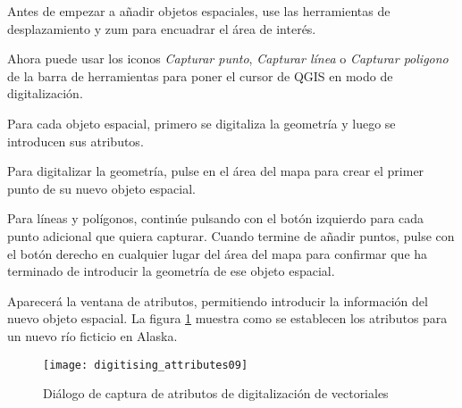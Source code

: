 
Antes de empezar a añadir objetos espaciales, use las herramientas de desplazamiento y zum para encuadrar el área de interés.

Ahora puede usar los iconos \textit{Capturar punto}, \textit{Capturar línea} o \textit{Capturar poligono} de la barra de herramientas para poner el cursor de QGIS en modo de digitalización.

Para cada objeto espacial, primero se digitaliza la geometría y luego se introducen sus atributos.

Para digitalizar la geometría, pulse en el área del mapa para crear el primer punto de su nuevo objeto espacial.

Para líneas y polígonos, continúe pulsando con el botón izquierdo para cada punto adicional que quiera capturar. Cuando termine de añadir puntos, pulse con el botón derecho en cualquier lugar del área del mapa para confirmar que ha terminado de introducir la geometría de ese objeto espacial.

Aparecerá la ventana de atributos, permitiendo introducir la información del nuevo objeto espacial. La figura \ref{fig:vector_digitising} muestra como se establecen los atributos para un nuevo río ficticio en Alaska.

\begin{figure}[ht]
   \begin{center}
   \caption{Diálogo de captura de atributos de digitalización de vectoriales}\label{fig:vector_digitising}\smallskip
   \texttt{[image: digitising\_attributes09]}
\end{center}  
\end{figure}

\begin{Tip}[h]\caption{\textsc{Tipos de valores de atributos}}
\end{Tip}

%
%
%
%
%

